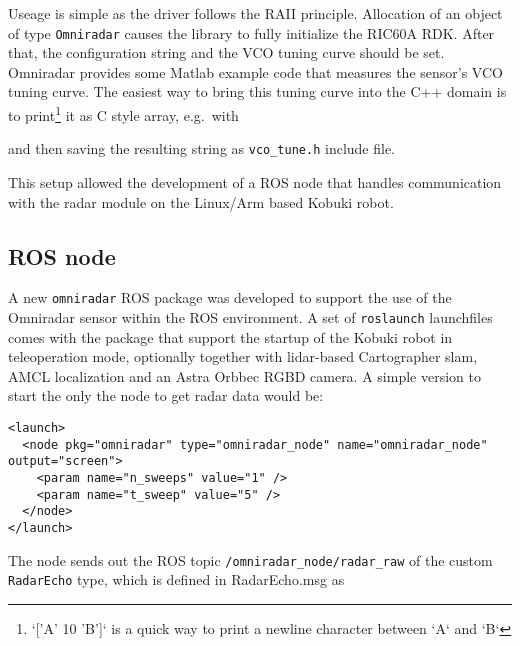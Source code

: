 Useage is simple as the driver follows the RAII principle. Allocation of
an object of type \texttt{Omniradar} causes the library to fully
initialize the RIC60A RDK. After that, the configuration string and the
VCO tuning curve should be set. Omniradar provides some Matlab example
code that measures the sensor's VCO tuning curve. The easiest way to
bring this tuning curve into the C++ domain is to
print\footnote{`['A' 10 'B']` is a quick way to print a newline character between `A` and `B`}
it as C style array, e.g.~with

\begin{Shaded}
\begin{Highlighting}[]
\NormalTok{[}    \NormalTok{]}
\end{Highlighting}
\end{Shaded}

and then saving the resulting string as \texttt{vco\_tune.h} include
file.

This setup allowed the development of a ROS node that handles
communication with the radar module on the Linux/Arm based Kobuki robot.

\subsection{ROS node}\label{ros-node}

A new \texttt{omniradar} ROS package was developed to support the use of
the Omniradar sensor within the ROS environment. A set of
\texttt{roslaunch} launchfiles comes with the package that support the
startup of the Kobuki robot in teleoperation mode, optionally together
with lidar-based Cartographer slam, AMCL localization and an Astra
Orbbec RGBD camera. A simple version to start the only the node to get
radar data would be:

\begin{verbatim}
<launch>
  <node pkg="omniradar" type="omniradar_node" name="omniradar_node" output="screen">
    <param name="n_sweeps" value="1" />
    <param name="t_sweep" value="5" />
  </node>
</launch>
\end{verbatim}

The node sends out the ROS topic \texttt{/omniradar\_node/radar\_raw} of
the custom \texttt{RadarEcho} type, which is defined in RadarEcho.msg as

